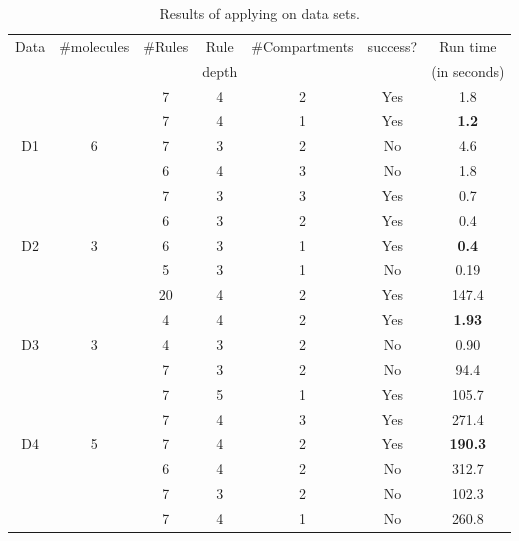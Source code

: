 \begin{table}[t]
  \centering
  \begin{tabular}[t]{|c|c|c|c|c|c|c|}\hline
    Data & \#molecules & \#Rules & Rule  & \#Compartments & success? & Run time \\
         &             &         & depth &               &          & (in seconds) \\\hline
         &   & 7  & 4 & 2 & Yes & 1.8  \\\cline{3-7}
         &   & 7  & 4 & 1 & Yes & {\bf 1.2}  \\\cline{3-7}
    D1   & 6 & 7  & 3 & 2 & No  & 4.6  \\\cline{3-7}
         &   & 6  & 4 & 3 & No  & 1.8  \\\hline
    
         &   & 7  & 3 & 3 & Yes & 0.7  \\\cline{3-7}
         &   & 6  & 3 & 2 & Yes & 0.4  \\\cline{3-7}
    D2   & 3 & 6  & 3 & 1 & Yes & {\bf 0.4}  \\\cline{3-7}
         &   & 5  & 3 & 1 & No  & 0.19 \\\hline

         &   & 20 & 4 & 2 & Yes & 147.4 \\\cline{3-7}
         &   & 4  & 4 & 2 & Yes & {\bf 1.93}  \\\cline{3-7}
    D3   & 3 & 4  & 3 & 2 & No  & 0.90  \\\cline{3-7}
         &   & 7  & 3 & 2 & No  & 94.4  \\\hline

         &   & 7 & 5 & 1 & Yes & 105.7 \\\cline{3-7}
         &   & 7 & 4 & 3 & Yes & 271.4 \\\cline{3-7}
    D4   & 5 & 7 & 4 & 2 & Yes & {\bf 190.3} \\\cline{3-7}
         &   & 6 & 4 & 2 & No  & 312.7 \\\cline{3-7}
         &   & 7 & 3 & 2 & No  & 102.3 \\\cline{3-7}
         &   & 7 & 4 & 1 & No  & 260.8 \\\hline

  \end{tabular}
  \caption{Results of applying \ourtool on data sets.
  }
  \label{tab:results}
\end{table}
